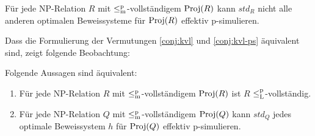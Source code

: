 \begin{conjecture}\label{conj:kvl-ps}
    Für jede NP-Relation $R$ mit $\leq_\mathrm{m}^\mathrm{p}$-vollständigem $\operatorname{Proj}(R)$ kann $\mathit{std}_R$ nicht alle anderen optimalen Beweissysteme für $\operatorname{Proj}(R)$ effektiv p-simulieren.


\end{conjecture}
Dass die Formulierung der Vermutungen \ref{conj:kvl} und \ref{conj:kvl-ps} äquivalent sind, zeigt folgende Beobachtung:
\begin{observation}
    Folgende Aussagen sind äquivalent:
    \begin{enumerate}
        \item Für jede NP-Relation $R$ mit $\leq_\mathrm{m}^\mathrm{p}$-vollständigem $\operatorname{Proj}(R)$ ist $R$ $\leq_\mathrm{L}^\mathrm{p}$-vollständig.
        \item Für jede NP-Relation $Q$ mit $\leq_\mathrm{m}^\mathrm{p}$-vollständigem $\operatorname{Proj}(Q)$ kann $\mathit{std}_Q$ jedes optimale Beweissystem $h$ für $\operatorname{Proj}(Q)$ effektiv p-simulieren.
    \end{enumerate}
\end{observation}
